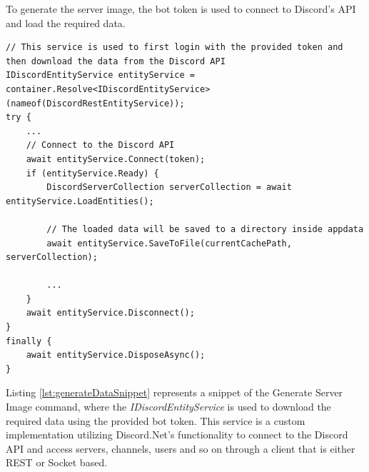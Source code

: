 To generate the server image, the bot token is used to connect to Discord's API and load the required data.
\begin{lstlisting}[style=CSharp, caption={Load data from the Discord API}, label={lst:generateDataSnippet}]
// This service is used to first login with the provided token and then download the data from the Discord API
IDiscordEntityService entityService = container.Resolve<IDiscordEntityService>(nameof(DiscordRestEntityService));
try {
	...
	// Connect to the Discord API
	await entityService.Connect(token);
	if (entityService.Ready) {
		DiscordServerCollection serverCollection = await entityService.LoadEntities();
		
		// The loaded data will be saved to a directory inside appdata
		await entityService.SaveToFile(currentCachePath, serverCollection);
		
		...
	}
	await entityService.Disconnect();
}
finally {
	await entityService.DisposeAsync();
}
\end{lstlisting}
Listing \ref{lst:generateDataSnippet} represents a snippet of the Generate Server Image command, where the \textit{IDiscordEntityService} is used to download the required data using the provided bot token. This service is a custom implementation utilizing Discord.Net's functionality to connect to the Discord API and access servers, channels, users and so on through a client that is either REST or Socket based.

